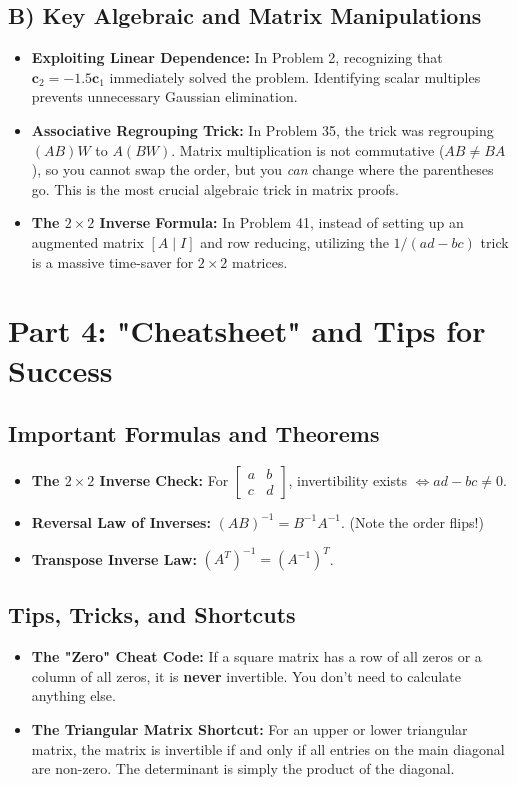 \documentclass[12pt]{article}
\begin{document}
\subsection{B) Key Algebraic and Matrix Manipulations}
\begin{itemize}
    \item \textbf{Exploiting Linear Dependence:} In Problem 2, recognizing that $\mathbf{c}_2 = -1.5 \mathbf{c}_1$ immediately solved the problem. Identifying scalar multiples prevents unnecessary Gaussian elimination.
    \item \textbf{Associative Regrouping Trick:} In Problem 35, the trick was regrouping $(AB)W$ to $A(BW)$. Matrix multiplication is not commutative ($AB \neq BA$), so you cannot swap the order, but you \emph{can} change where the parentheses go. This is the most crucial algebraic trick in matrix proofs.
    \item \textbf{The $2 \times 2$ Inverse Formula:} In Problem 41, instead of setting up an augmented matrix $[A \mid I]$ and row reducing, utilizing the $1/(ad-bc)$ trick is a massive time-saver for $2 \times 2$ matrices.
\end{itemize}


\section{Part 4: "Cheatsheet" and Tips for Success}

\subsection{Important Formulas and Theorems}
\begin{itemize}
    \item \textbf{The $2 \times 2$ Inverse Check:} For $\begin{bmatrix} a & b \\ c & d \end{bmatrix}$, invertibility exists $\iff ad-bc \neq 0$.
    \item \textbf{Reversal Law of Inverses:} $(AB)^{-1} = B^{-1}A^{-1}$. (Note the order flips!)
    \item \textbf{Transpose Inverse Law:} $(A^T)^{-1} = (A^{-1})^T$.
\end{itemize}

\subsection{Tips, Tricks, and Shortcuts}
\begin{itemize}
    \item \textbf{The "Zero" Cheat Code:} If a square matrix has a row of all zeros or a column of all zeros, it is \textbf{never} invertible. You don't need to calculate anything else.
    \item \textbf{The Triangular Matrix Shortcut:} For an upper or lower triangular matrix, the matrix is invertible if and only if all entries on the main diagonal are non-zero. The determinant is simply the product of the diagonal.
\end{itemize}
\end{document}
